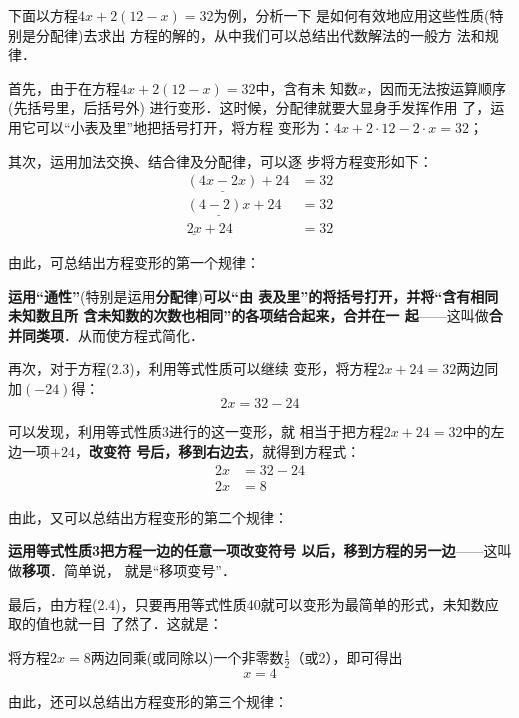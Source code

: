下面以方程$4x+2(12-x) =32$为例，分析一下
是如何有效地应用这些性质(特别是分配律)去求出
方程的解的，从中我们可以总结出代数解法的一般方
法和规律．

首先，由于在方程$4x+2(12-x)= 32$中，含有未
知数$x$，因而无法按运算顺序(先括号里，后括号外)
进行变形．这时候，分配律就要大显身手发挥作用
了，运用它可以“小表及里”地把括号打开，将方程
变形为：$4x+2\cdot 12-2 \cdot  x = 32$；

其次，运用加法交换、结合律及分配律，可以逐
步将方程变形如下：
\begin{equation}
    \begin{split}
        \underline{(4x-2x)}+24&=32\\
        \underline{(4-2)x}+24&=32\\
        \underline{2x}+24&=32
    \end{split}
\end{equation}

由此，可总结出方程变形的第一个规律：

\textbf{运用“通性”}(特别是运用\textbf{分配律})\textbf{可以“由
表及里”的将括号打开，并将“含有相同未知数且所
含未知数的次数也相同”的各项结合起来，合并在一
起}——这叫做\textbf{合并同类项}．从而使方程式简化．

再次，对于方程(2.3)，利用等式性质可以继续
变形，将方程$2x+24 = 32$两边同加$(-24)$得：
\[2x = 32 -24\]

可以发现，利用等式性质3进行的这一变形，就
相当于把方程$2x+24 = 32$中的左边一项$+24$，\textbf{改变符
号后，移到右边去}，就得到方程式：
\begin{equation}
    \begin{split}
        2x &= 32 -24\\
        2x&=8
    \end{split}
\end{equation}

由此，又可以总结出方程变形的第二个规律：

\textbf{运用等式性质3把方程一边的任意一项改变符号
以后，移到方程的另一边}——这叫做\textbf{移项}．简单说，
就是“移项变号”．

最后，由方程(2.4)，只要再用等式性质40就可以变形为最简单的形式，未知数应取的值也就一目
了然了．这就是：

将方程$2x = 8$两边同乘(或同除以)一个非零数$\frac{1}{2}$（或2），即可得出
\begin{equation}
    x=4
\end{equation}

由此，还可以总结出方程变形的第三个规律：

